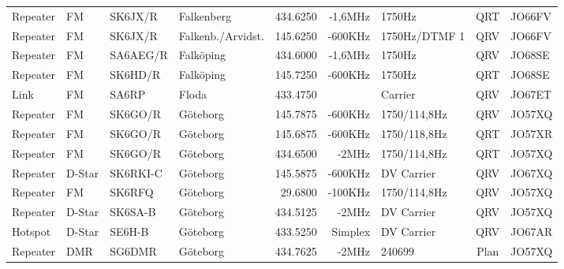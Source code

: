 \begin{landscape}
\begin{longtable}{llllrrlcl}
	Repeater          & FM           & SK6JX/R       & Falkenberg          &          434.6250 &        -1,6MHz & 1750Hz          &       QRT       & JO66FV           \\
	Repeater          & FM           & SK6JX/R       & Falkenb./Arvidst.   &          145.6250 &        -600KHz & 1750Hz/DTMF 1   &       QRV       & JO66FV           \\
	Repeater          & FM           & SA6AEG/R      & Falköping           &          434.6000 &        -1,6MHz & 1750Hz          &       QRV       & JO68SE           \\
	Repeater          & FM           & SK6HD/R       & Falköping           &          145.7250 &        -600KHz & 1750Hz          &       QRT       & JO68SE           \\
	Link              & FM           & SA6RP         & Floda               &          433.4750 &                & Carrier         &       QRV       & JO67ET           \\
	Repeater          & FM           & SK6GO/R       & Göteborg            &          145.7875 &        -600KHz & 1750/114,8Hz    &       QRV       & JO57XQ           \\
	Repeater          & FM           & SK6GO/R       & Göteborg            &          145.6875 &        -600KHz & 1750/118,8Hz    &       QRT       & JO57XR           \\
	Repeater          & FM           & SK6GO/R       & Göteborg            &          434.6500 &          -2MHz & 1750/114,8Hz    &       QRT       & JO57XQ           \\
	Repeater          & D-Star       & SK6RKI-C      & Göteborg            &          145.5875 &        -600KHz & DV Carrier      &       QRV       & JO67XQ           \\
	Repeater          & FM           & SK6RFQ        & Göteborg            &           29.6800 &        -100KHz & 1750/114,8Hz    &       QRV       & JO57XQ           \\
	Repeater          & D-Star       & SK6SA-B       & Göteborg            &          434.5125 &          -2MHz & DV Carrier      &       QRV       & JO57XQ           \\
	Hotspot           & D-Star       & SE6H-B        & Göteborg            &          433.5250 &        Simplex & DV Carrier      &       QRV       & JO67AR           \\
	Repeater          & DMR          & SG6DMR        & Göteborg            &          434.7625 &          -2MHz & 240699          &      Plan       & JO57XQ           \\

\end{longtable}
\end{landscape}
